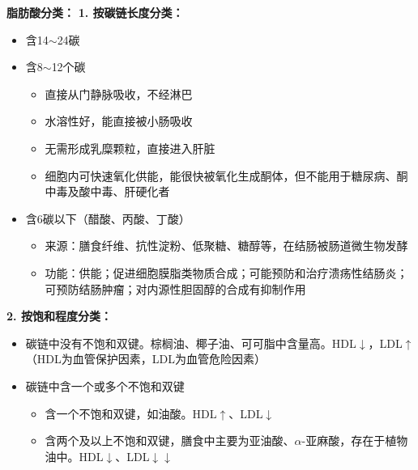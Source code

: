 \begin{keybox}
\textbf{脂肪酸分类\difficulty：}
\textbf{1. 按碳链长度分类：}
\begin{itemize}[leftmargin=*]
    \item {}含14$\sim$24碳
    \item {}含8$\sim$12个碳
    \begin{itemize}
        \item 直接从门静脉吸收，不经淋巴
        \item 水溶性好，能直接被小肠吸收
        \item 无需形成乳糜颗粒，直接进入肝脏
        \item 细胞内可快速氧化供能，能很快被氧化生成酮体，但不能用于糖尿病、酮中毒及酸中毒、肝硬化者
    \end{itemize}
    \item {}含6碳以下（醋酸、丙酸、丁酸）
    \begin{itemize}
        \item 来源：膳食纤维、抗性淀粉、低聚糖、糖醇等，在结肠被肠道微生物发酵
        \item 功能：供能；促进细胞膜脂类物质合成；可能预防和治疗溃疡性结肠炎；可预防结肠肿瘤；对内源性胆固醇的合成有抑制作用
    \end{itemize}
\end{itemize}

\textbf{2. 按饱和程度分类：}
\begin{itemize}[leftmargin=*]
    \item {}碳链中没有不饱和双键。棕榈油、椰子油、可可脂中含量高。HDL$\downarrow$，LDL$\uparrow$（HDL为血管保护因素，LDL为血管危险因素）
    \item {}碳链中含一个或多个不饱和双键
    \begin{itemize}
        \item {}含一个不饱和双键，如油酸。HDL$\uparrow$、LDL$\downarrow$
        \item {}含两个及以上不饱和双键，膳食中主要为亚油酸、$\alpha$-亚麻酸，存在于植物油中。HDL$\downarrow$、LDL$\downarrow\downarrow$
    \end{itemize}
\end{itemize}


\end{keybox}
